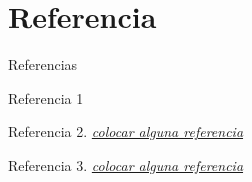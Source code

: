 \section{Referencia}
\begin{frame}{Referencias}
	\begin{thebibliography}{00}
		\beamertemplatebookbibitems
		Referencia 1
		
		\beamertemplateonlinebibitems
		Referencia 2. \href{}{\em colocar alguna referencia}
		
		\beamertemplatearticlebibitems
		Referencia 3. \href{}{\em colocar alguna referencia}
	\end{thebibliography}
\end{frame}